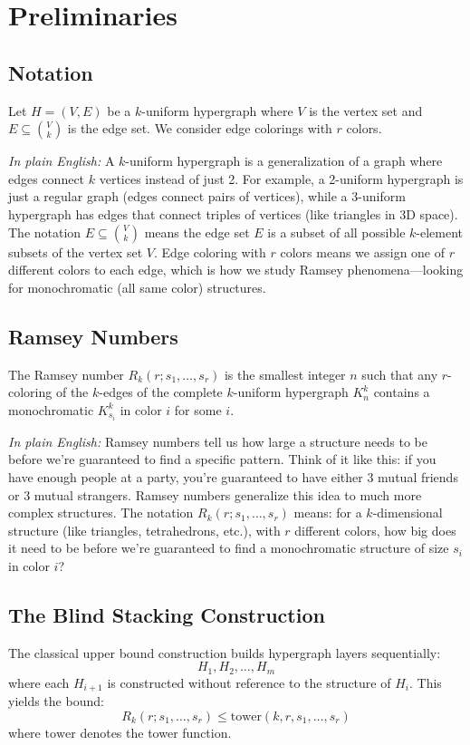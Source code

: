 \documentclass[12pt]{article}
\begin{document}
\section{Preliminaries}

\subsection{Notation}
Let $H = (V, E)$ be a $k$-uniform hypergraph where $V$ is the vertex set and $E \subseteq \binom{V}{k}$ is the edge set. We consider edge colorings with $r$ colors.

\textit{In plain English:} A $k$-uniform hypergraph is a generalization of a graph where edges connect $k$ vertices instead of just 2. For example, a 2-uniform hypergraph is just a regular graph (edges connect pairs of vertices), while a 3-uniform hypergraph has edges that connect triples of vertices (like triangles in 3D space). The notation $E \subseteq \binom{V}{k}$ means the edge set $E$ is a subset of all possible $k$-element subsets of the vertex set $V$. Edge coloring with $r$ colors means we assign one of $r$ different colors to each edge, which is how we study Ramsey phenomena—looking for monochromatic (all same color) structures.

\subsection{Ramsey Numbers}
The Ramsey number $R_k(r; s_1, \ldots, s_r)$ is the smallest integer $n$ such that any $r$-coloring of the $k$-edges of the complete $k$-uniform hypergraph $K_n^k$ contains a monochromatic $K_{s_i}^k$ in color $i$ for some $i$.

\textit{In plain English:} Ramsey numbers tell us how large a structure needs to be before we're guaranteed to find a specific pattern. Think of it like this: if you have enough people at a party, you're guaranteed to have either 3 mutual friends or 3 mutual strangers. Ramsey numbers generalize this idea to much more complex structures. The notation $R_k(r; s_1, \ldots, s_r)$ means: for a $k$-dimensional structure (like triangles, tetrahedrons, etc.), with $r$ different colors, how big does it need to be before we're guaranteed to find a monochromatic structure of size $s_i$ in color $i$?

\subsection{The Blind Stacking Construction}
The classical upper bound construction builds hypergraph layers sequentially:
\begin{equation}
H_1, H_2, \ldots, H_m
\end{equation}
where each $H_{i+1}$ is constructed without reference to the structure of $H_i$. This yields the bound:
\begin{equation}
R_k(r; s_1, \ldots, s_r) \leq \text{tower}(k, r, s_1, \ldots, s_r)
\end{equation}
where $\text{tower}$ denotes the tower function.
\end{document}
